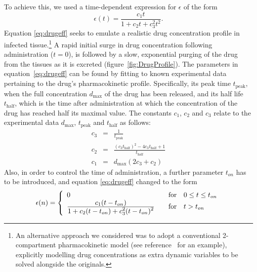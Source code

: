 \documentclass[a4paper, 12pt]{report}
\begin{document}
To achieve this, we used a time-dependent expression for $\epsilon$ of the form
\begin{equation}
\epsilon(t) = \frac{c_{1}t}{1 + c_{2}t+c_{3}^{2}t^{2}}. \label{eq:drugeff}
\end{equation}
Equation \eqref{eq:drugeff} seeks to emulate a realistic drug concentration profile in infected tissue.\footnote{An alternative approach we considered was to adopt a conventional 2-compartment pharmacokinetic model (see reference~\cite{Tsoukias} for an example), explicitly modelling drug concentrations as extra dynamic variables to be solved alongside the originals.}
A rapid initial surge in drug concentration following administration ($t = 0$), is followed by a slow, exponential purging of the drug from the tissues as it is excreted (figure~\ref{fig:DrugProfile}). The parameters in equation~\ref{eq:drugeff} can be found by fitting to known experimental data pertaining to the drug's pharmacokinetic profile.
Specifically, its peak time $t_{\textrm{peak}}$, when the full concentration $d_{\textrm{max}}$ of the drug has been released, and its half life $t_{\textrm{half}}$, which is the time after administration at which the concentration of the drug has reached half its maximal value. The constants $c_1$, $c_2$ and $c_3$ relate to the experimental data $d_{\textrm{max}}$, $t_{\textrm{peak}}$ and $t_{\textrm{half}}$ as follows:
\begin{eqnarray}
c_3 &=& \frac{1}{t_{\textrm{peak}}}\\
c_2 &=& \frac{(c_3 t_{\textrm{half}})^2 - 4 c_3 t_{\textrm{half}} + 1}{t_{\textrm{half}}}\\
c_1 &=& d_{\textrm{max}} (2 c_3 + c_2)
\end{eqnarray}
Also, in order to control the time of administration, a further parameter $t_{on}$ has to be introduced, and equation \eqref{eq:drugeff} changed to the form
\begin{equation}
\epsilon(n) = \left\{ 
   \begin{array}{l l}
     0 & \quad \text{for} \quad 0 \leq t \leq t_{on}\\
     \frac{\displaystyle c_{1}(t-t_{on})}{\displaystyle 1 + c_{2}(t-t_{on})+c_{3}^{2}(t-t_{on})^{2}} & \quad \text{for} \quad t > t_{on}
   \end{array} \right. \label{eq:drugadmin}
\end{equation}
\end{document}
